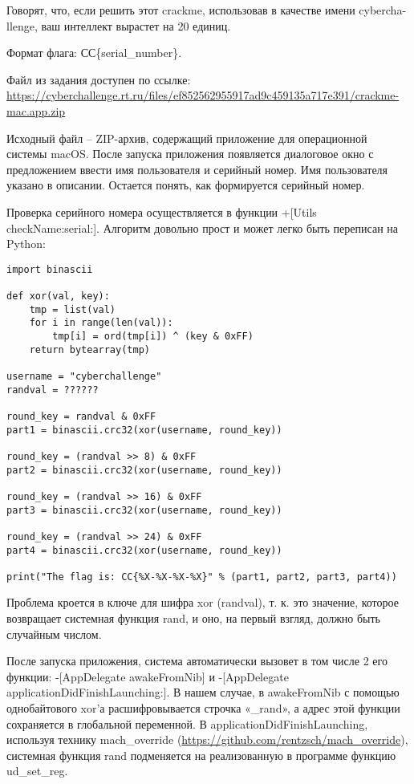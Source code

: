 
Говорят, что, если решить этот crackme, использовав в качестве имени cybercha-\linebreak llenge, ваш интеллект вырастет на 20 единиц.

Формат флага: СС\{serial\_number\}.

Файл из задания доступен по ссылке: \url{
https://cyberchallenge.rt.ru/files/ef852562955917ad9c459135a717e391/crackme-mac.app.zip}

\solutionSection

Исходный файл – ZIP-архив, содержащий приложение для операционной системы macOS. После запуска приложения появляется диалоговое окно с предложением ввести имя пользователя и серийный номер. Имя пользователя указано в описании. Остается понять, как формируется серийный номер.

Проверка серийного номера осуществляется в функции +[Utils checkName:serial:]. Алгоритм довольно прост и может легко быть переписан на Python:

\begin{verbatim}
import binascii

def xor(val, key):
    tmp = list(val)
    for i in range(len(val)):
        tmp[i] = ord(tmp[i]) ^ (key & 0xFF)
    return bytearray(tmp)

username = "cyberchallenge"
randval = ??????

round_key = randval & 0xFF
part1 = binascii.crc32(xor(username, round_key))

round_key = (randval >> 8) & 0xFF
part2 = binascii.crc32(xor(username, round_key))

round_key = (randval >> 16) & 0xFF
part3 = binascii.crc32(xor(username, round_key))

round_key = (randval >> 24) & 0xFF
part4 = binascii.crc32(xor(username, round_key))

print("The flag is: CC{%X-%X-%X-%X}" % (part1, part2, part3, part4))
\end{verbatim}

Проблема кроется в ключе для шифра xor (randval), т. к. это значение, которое возвращает системная функция rand, и оно, на первый взгляд, должно быть случайным числом.


После запуска приложения, система автоматически вызовет в том числе 2 его функции: -[AppDelegate awakeFromNib] и -[AppDelegate applicationDidFinishLaunching:]. В нашем случае, в awakeFromNib с помощью однобайтового xor’а расшифровывается строчка «\_rand», а адрес этой функции сохраняется в глобальной переменной. В applicationDidFinishLaunching, используя технику mach\_override (\url{https://github.com/rentzsch/mach_override}), системная функция rand подменяется на реализованную в программе функцию ud\_set\_reg.

